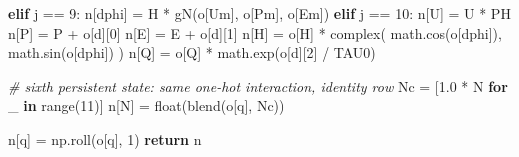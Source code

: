 \documentclass[
  a4paper,
]{ltjsarticle}
\newenvironment{Shaded}{}{}
\newcommand{\BuiltInTok}[1]{\textcolor[rgb]{0.00,0.50,0.00}{#1}}
\newcommand{\CommentTok}[1]{\textcolor[rgb]{0.38,0.63,0.69}{\textit{#1}}}
\newcommand{\ControlFlowTok}[1]{\textcolor[rgb]{0.00,0.44,0.13}{\textbf{#1}}}
\newcommand{\DecValTok}[1]{\textcolor[rgb]{0.25,0.63,0.44}{#1}}
\newcommand{\FloatTok}[1]{\textcolor[rgb]{0.25,0.63,0.44}{#1}}
\newcommand{\KeywordTok}[1]{\textcolor[rgb]{0.00,0.44,0.13}{\textbf{#1}}}
\newcommand{\NormalTok}[1]{#1}
\newcommand{\OperatorTok}[1]{\textcolor[rgb]{0.40,0.40,0.40}{#1}}
\newcommand{\StringTok}[1]{\textcolor[rgb]{0.25,0.44,0.63}{#1}}
\begin{document}
\begin{Shaded}
\begin{Highlighting}[]
    \ControlFlowTok{elif}\NormalTok{ j }\OperatorTok{==} \DecValTok{9}\NormalTok{:}
\NormalTok{        n[}\StringTok{\textquotesingle{}dphi\textquotesingle{}}\NormalTok{] }\OperatorTok{=}\NormalTok{ H }\OperatorTok{*}\NormalTok{ gN(o[}\StringTok{\textquotesingle{}Um\textquotesingle{}}\NormalTok{], o[}\StringTok{\textquotesingle{}Pm\textquotesingle{}}\NormalTok{], o[}\StringTok{\textquotesingle{}Em\textquotesingle{}}\NormalTok{])}
    \ControlFlowTok{elif}\NormalTok{ j }\OperatorTok{==} \DecValTok{10}\NormalTok{:}
\NormalTok{        n[}\StringTok{\textquotesingle{}U\textquotesingle{}}\NormalTok{] }\OperatorTok{=}\NormalTok{ U }\OperatorTok{*}\NormalTok{ PH}
\NormalTok{        n[}\StringTok{\textquotesingle{}P\textquotesingle{}}\NormalTok{] }\OperatorTok{=}\NormalTok{ P }\OperatorTok{+}\NormalTok{ o[}\StringTok{\textquotesingle{}d\textquotesingle{}}\NormalTok{][}\DecValTok{0}\NormalTok{]}
\NormalTok{        n[}\StringTok{\textquotesingle{}E\textquotesingle{}}\NormalTok{] }\OperatorTok{=}\NormalTok{ E }\OperatorTok{+}\NormalTok{ o[}\StringTok{\textquotesingle{}d\textquotesingle{}}\NormalTok{][}\DecValTok{1}\NormalTok{]}
\NormalTok{        n[}\StringTok{\textquotesingle{}H\textquotesingle{}}\NormalTok{] }\OperatorTok{=}\NormalTok{ o[}\StringTok{\textquotesingle{}H\textquotesingle{}}\NormalTok{] }\OperatorTok{*} \BuiltInTok{complex}\NormalTok{(}
\NormalTok{            math.cos(o[}\StringTok{\textquotesingle{}dphi\textquotesingle{}}\NormalTok{]), math.sin(o[}\StringTok{\textquotesingle{}dphi\textquotesingle{}}\NormalTok{])}
\NormalTok{        )}
\NormalTok{        n[}\StringTok{\textquotesingle{}Q\textquotesingle{}}\NormalTok{] }\OperatorTok{=}\NormalTok{ o[}\StringTok{\textquotesingle{}Q\textquotesingle{}}\NormalTok{] }\OperatorTok{*}\NormalTok{ math.exp(o[}\StringTok{\textquotesingle{}d\textquotesingle{}}\NormalTok{][}\DecValTok{2}\NormalTok{] }\OperatorTok{/}\NormalTok{ TAU0)}

    \CommentTok{\# sixth persistent state: same one{-}hot interaction, identity row}
\NormalTok{    Nc }\OperatorTok{=}\NormalTok{ [}\FloatTok{1.0} \OperatorTok{*}\NormalTok{ N }\ControlFlowTok{for}\NormalTok{ \_ }\KeywordTok{in} \BuiltInTok{range}\NormalTok{(}\DecValTok{11}\NormalTok{)]}
\NormalTok{    n[}\StringTok{\textquotesingle{}N\textquotesingle{}}\NormalTok{] }\OperatorTok{=} \BuiltInTok{float}\NormalTok{(blend(o[}\StringTok{\textquotesingle{}q\textquotesingle{}}\NormalTok{], Nc))}

\NormalTok{    n[}\StringTok{\textquotesingle{}q\textquotesingle{}}\NormalTok{] }\OperatorTok{=}\NormalTok{ np.roll(o[}\StringTok{\textquotesingle{}q\textquotesingle{}}\NormalTok{], }\DecValTok{1}\NormalTok{)}
    \ControlFlowTok{return}\NormalTok{ n}
\end{Highlighting}
\end{Shaded}
\end{document}
